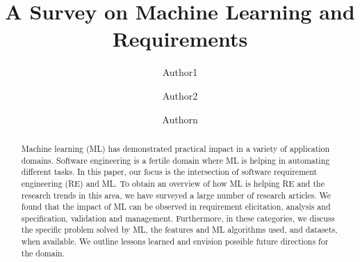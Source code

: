 \documentclass{llncs}
\begin{document}
\frontmatter          %
\mainmatter              %

\title{A Survey on Machine Learning and Requirements} 

 
\author{Author1 \and Author2 \and Authorn} \authorrunning{} %
%

\maketitle              %
\begin{abstract}
Machine learning (ML) has demonstrated practical impact in a variety of application domains. Software engineering is a fertile domain where ML is helping in automating  different tasks. In this paper, our focus is the intersection of software requirement engineering (RE) and ML.  To obtain an overview of how ML is helping RE and the research trends in this area, we have surveyed a large number of research articles. We found that the impact of ML can be observed in requirement elicitation, analysis and specification, validation and management. Furthermore, in these categories, we discuss the specific problem solved by ML, the features and ML algorithms used, and datasets, when available. We outline lessons learned and envision possible future directions for the domain.
\end{abstract}
%  
 







 
 
 
 
\end{document}
